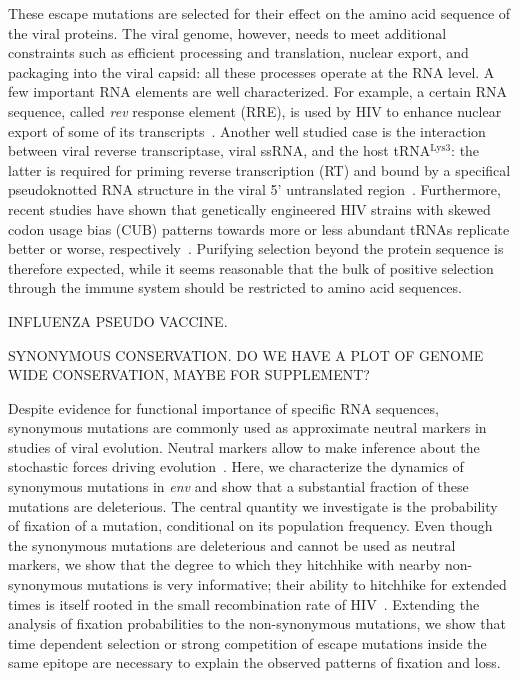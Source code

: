 \documentclass[rmp, twocolumn]{revtex4}
\newcommand{\env}{\textit{env}}
\newcommand{\rev}{\textit{rev}}
\begin{document}
These escape mutations are selected for their effect on the amino acid sequence
of the viral proteins. The viral genome, however, needs to meet additional
constraints such as efficient processing and translation, nuclear export, and
packaging into the viral capsid: all these processes operate at the RNA level. A
few important RNA elements are well characterized. For example, a certain RNA
sequence, called \rev{} response element (RRE), is used by HIV to enhance
nuclear export of some of its transcripts~\citep{fernandes_hiv-1_2012}. Another
well studied case is the interaction between viral reverse transcriptase, viral
ssRNA, and the host tRNA$^\text{Lys3}$: the latter is required for priming
reverse transcription (RT) and bound by a specifical pseudoknotted RNA structure
in the viral 5' untranslated region~\citep{barat_interaction_1991,
paillart_vitro_2002}. Furthermore, recent studies have shown that genetically
engineered HIV strains with skewed codon usage bias (CUB) patterns towards more
or less abundant tRNAs replicate better or worse,
respectively~\citep{ngumbela_quantitative_2008, li_codon-usage-based_2012}.
Purifying selection beyond the protein sequence is therefore expected, while it
seems reasonable that the bulk of positive selection through the immune system
should be restricted to amino acid sequences.

INFLUENZA PSEUDO VACCINE.

SYNONYMOUS CONSERVATION. DO WE HAVE A PLOT OF GENOME WIDE CONSERVATION, MAYBE FOR SUPPLEMENT?

Despite evidence for functional importance of specific RNA sequences, synonymous
mutations are commonly used as approximate neutral markers in studies of viral
evolution. Neutral markers allow to make inference about the stochastic forces
driving evolution~\citep{smth}. Here, we characterize the dynamics of synonymous
mutations in \env{} and show that a substantial fraction of these mutations are
deleterious. The central quantity we investigate is the probability of fixation
of a mutation, conditional on its population frequency. Even though the
synonymous mutations are deleterious and cannot be used as neutral markers, we
show that the degree to which they hitchhike with nearby non-synonymous
mutations is very informative; their ability to hitchhike for extended times is
itself rooted in the small recombination rate of
HIV~\citep{neher_recombination_2010, batorsky_estimate_2011}. Extending the
analysis of fixation probabilities to the non-synonymous mutations, we show that
time dependent selection or strong competition of escape mutations inside the
same epitope are necessary to explain the observed patterns of fixation and
loss. 
\end{document}
